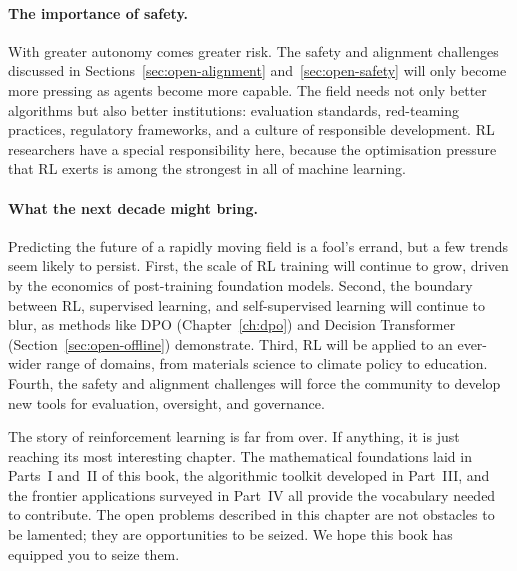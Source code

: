 \paragraph{The importance of safety.}
With greater autonomy comes greater risk.  The safety and alignment
challenges discussed in Sections~\ref{sec:open-alignment}
and~\ref{sec:open-safety} will only become more pressing as agents
become more capable.  The field needs not only better algorithms but
also better institutions: evaluation standards, red-teaming
practices, regulatory frameworks, and a culture of responsible
development.  RL researchers have a special responsibility here, because
the optimisation pressure that RL exerts is among the strongest in
all of machine learning.

\paragraph{What the next decade might bring.}
Predicting the future of a rapidly moving field is a fool's errand,
but a few trends seem likely to persist.  First, the scale of RL
training will continue to grow, driven by the economics of
post-training foundation models.  Second, the boundary between RL,
supervised learning, and self-supervised learning will continue to
blur, as methods like DPO (Chapter~\ref{ch:dpo}) and Decision
Transformer (Section~\ref{sec:open-offline}) demonstrate.  Third, RL
will be applied to an ever-wider range of domains, from materials
science to climate policy to education.  Fourth, the safety and
alignment challenges will force the community to develop new tools for
evaluation, oversight, and governance.

The story of reinforcement learning is far from over.  If anything, it
is just reaching its most interesting chapter.  The mathematical
foundations laid in Parts~I and~II of this book, the algorithmic
toolkit developed in Part~III, and the frontier applications surveyed
in Part~IV all provide the vocabulary needed to contribute.  The open
problems described in this chapter are not obstacles to be lamented;
they are opportunities to be seized.  We hope this book has equipped
you to seize them.
